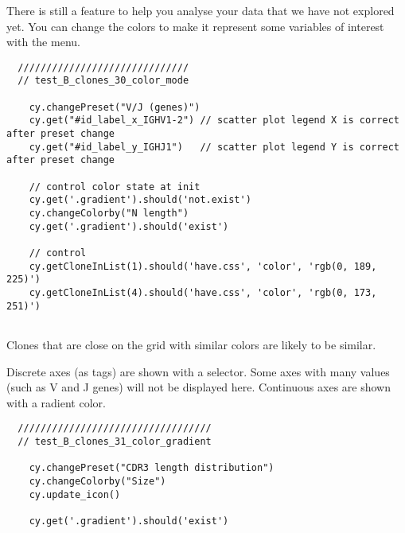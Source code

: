 There is still a feature to help you analyse your data that we have not
explored yet.
You can change the colors to make it represent some variables of interest
with the  menu.
\begin{verbatim}
  //////////////////////////////
  // test_B_clones_30_color_mode

    cy.changePreset("V/J (genes)")
    cy.get("#id_label_x_IGHV1-2") // scatter plot legend X is correct after preset change
    cy.get("#id_label_y_IGHJ1")   // scatter plot legend Y is correct after preset change

    // control color state at init
    cy.get('.gradient').should('not.exist')
    cy.changeColorby("N length")
    cy.get('.gradient').should('exist')

    // control
    cy.getCloneInList(1).should('have.css', 'color', 'rgb(0, 189, 225)')
    cy.getCloneInList(4).should('have.css', 'color', 'rgb(0, 173, 251)')


\end{verbatim}
  
Clones that are close on the grid with similar colors are likely to
be similar.

Discrete axes (as tags) are shown with a selector.
Some axes with many values (such as V and J genes) will not be displayed here.
Continuous axes are shown with a radient color.
\begin{verbatim}
  //////////////////////////////////
  // test_B_clones_31_color_gradient

    cy.changePreset("CDR3 length distribution")
    cy.changeColorby("Size")
    cy.update_icon()

    cy.get('.gradient').should('exist')


\end{verbatim}

